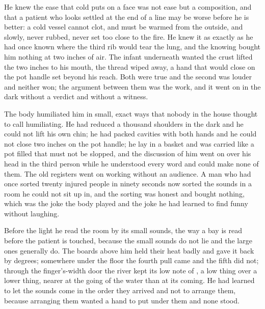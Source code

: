 He knew the ease that cold puts on a face was not ease but a composition, and that a patient who looks settled at the end of a line may be worse before he is better: a cold vessel cannot clot, and must be warmed from the outside, and slowly, never rubbed, never set too close to the fire. He knew it as exactly as he had once known where the third rib would tear the lung, and the knowing bought him nothing at two inches of air. The infant underneath wanted the crust lifted the two inches to his mouth, the thread wiped away, a hand that would close on the pot handle set beyond his reach. Both were true and the second was louder and neither won; the argument between them was the work, and it went on in the dark without a verdict and without a witness.

The body humiliated him in small, exact ways that nobody in the house thought to call humiliating. He had reduced a thousand shoulders in the dark and he could not lift his own chin; he had packed cavities with both hands and he could not close two inches on the pot handle; he lay in a basket and was carried like a pot filled that must not be slopped, and the discussion of him went on over his head in the third person while he understood every word and could make none of them. The old registers went on working without an audience. A man who had once sorted twenty injured people in ninety seconds now sorted the sounds in a room he could not sit up in, and the sorting was honest and bought nothing, which was the joke the body played and the joke he had learned to find funny without laughing.

Before the light he read the room by its small sounds, the way a bay is read before the patient is touched, because the small sounds do not lie and the large ones generally do. The boards above him held their heat badly and gave it back by degrees; somewhere under the floor the fourth pull came and the fifth did not; through the finger's-width door the river kept its low note of , a low thing over a lower thing, nearer at the going of the water than at its coming. He had learned to let the sounds come in the order they arrived and not to arrange them, because arranging them wanted a hand to put under them and none stood.

\scenebreak

